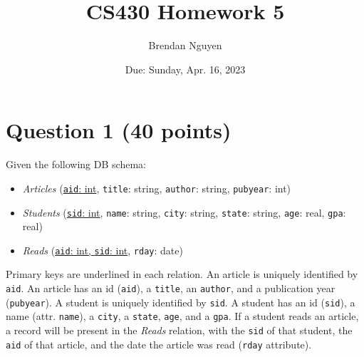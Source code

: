 \documentclass[letterpaper, 11pt]{article}
\title{CS430 Homework 5}
\author{Brendan Nguyen}
\date{Due: Sunday, Apr. 16, 2023}
\begin{document}
\maketitle

\section*{Question 1 (40 points)}

Given the following DB schema:
\begin{itemize}
    \item \textit{Articles} (\underline{\texttt{aid}: int}, \texttt{title}: string, \texttt{author}: string, \texttt{pubyear}: int)
    \item \textit{Students} (\underline{\texttt{sid}: int}, \texttt{name}: string, \texttt{city}: string, \texttt{state}: string, \texttt{age}: real, \texttt{gpa}: real)
    \item \textit{Reads} (\underline{\texttt{aid}: int, \texttt{sid}: int}, \texttt{rday}: date)
\end{itemize}

Primary keys are underlined in each relation. An article is uniquely identified by \texttt{aid}. An article has an id (\texttt{aid}), a \texttt{title}, an \texttt{author}, and a publication year (\texttt{pubyear}). A student is uniquely identified by \texttt{sid}. A student has an id (\texttt{sid}), a name (attr. \texttt{name}), a \texttt{city}, a \texttt{state}, \texttt{age}, and a \texttt{gpa}. If a student reads an article, a record will be present in the \textit{Reads} relation, with the \texttt{sid} of that student, the \texttt{aid} of that article, and the date the article was read (\texttt{rday} attribute).
\end{document}
